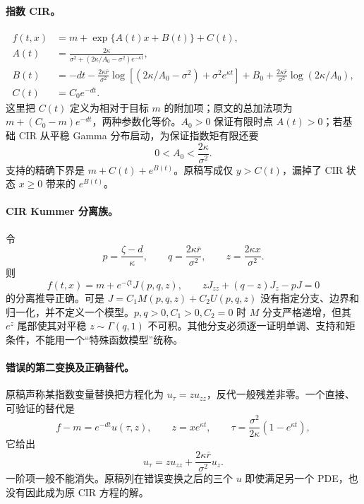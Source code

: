 \documentclass[UTF8,11pt]{ctexart}
\begin{document}
\paragraph{指数 CIR。}
\begin{align*}
f(t,x)&=m+\exp\{A(t)x+B(t)\}+C(t),\\
A(t)&=\frac{2\kappa}{\sigma^2+(2\kappa/A_0-\sigma^2)e^{-\kappa t}},\\
B(t)&=-dt-\frac{2\kappa\bar r}{\sigma^2}
\log\!\left[(2\kappa/A_0-\sigma^2)+\sigma^2e^{\kappa t}\right]
+B_0+\frac{2\kappa\bar r}{\sigma^2}\log(2\kappa/A_0),\\
C(t)&=C_0e^{-dt}.
\end{align*}
这里把 $C(t)$ 定义为相对于目标 $m$ 的附加项；原文的总加法项为
$m+(C_0-m)e^{-dt}$，两种参数化等价。$A_0>0$ 保证有限时点 $A(t)>0$；若基础 CIR 从平稳 Gamma 分布启动，为保证指数矩有限还要
\begin{equation}
0<A_0<\frac{2\kappa}{\sigma^2}.
\label{cmp:cir-exp-moment}
\end{equation}
支持的精确下界是 $m+C(t)+e^{B(t)}$。原稿写成仅 $y>C(t)$，漏掉了 CIR 状态 $x\ge0$ 带来的 $e^{B(t)}$。

\paragraph{CIR Kummer 分离族。}
令
\[
p=\frac{\zeta-d}{\kappa},\qquad q=\frac{2\kappa\bar r}{\sigma^2},\qquad
z=\frac{2\kappa x}{\sigma^2}.
\]
则
\[
f(t,x)=m+e^{-\zeta t}J(p,q,z),\qquad
zJ_{zz}+(q-z)J_z-pJ=0
\]
的分离推导正确。可是 $J=C_1M(p,q,z)+C_2U(p,q,z)$ 没有指定分支、边界和归一化，并不定义一个模型。$p,q>0,C_1>0,C_2=0$ 时 $M$ 分支严格递增，但其 $e^z$ 尾部使其对平稳 $z\sim\Gamma(q,1)$ 不可积。其他分支必须逐一证明单调、支持和矩条件，不能用一个“特殊函数模型”统称。

\paragraph{错误的第二变换及正确替代。}
原稿声称某指数变量替换把方程化为 $u_\tau=zu_{zz}$，反代一般残差非零。一个直接、可验证的替代是
\[
f-m=e^{-dt}u(\tau,z),\qquad
z=xe^{\kappa t},\qquad
\tau=\frac{\sigma^2}{2\kappa}(1-e^{\kappa t}),
\]
它给出
\begin{equation}
u_\tau=zu_{zz}+\frac{2\kappa\bar r}{\sigma^2}u_z.
\label{cmp:correct-cir-reduction}
\end{equation}
一阶项一般不能消失。原稿列在错误变换之后的三个 $u$ 即使满足另一个 PDE，也没有因此成为原 CIR 方程的解。
\end{document}
